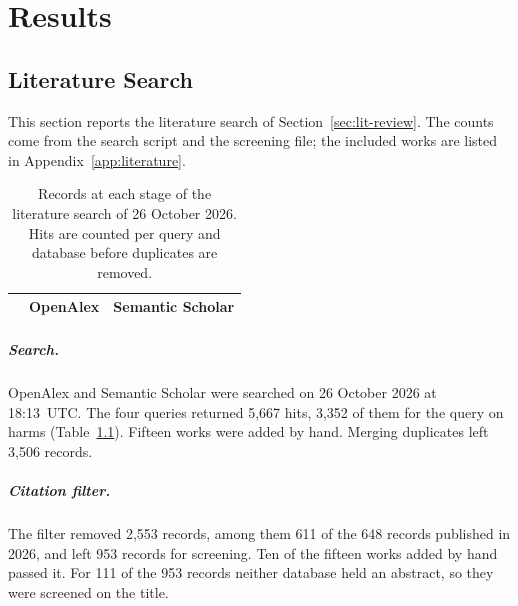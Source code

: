 \chapter{Results}
\label{ch:results}


\section{Literature Search}
\label{sec:results-lit}
This section reports the literature search of Section~\ref{sec:lit-review}.
The counts come from the search script and the screening file; the included
works are listed in Appendix~\ref{app:literature}.

\begin{table}[tbp]
\centering
\small
\caption[Records at each stage of the literature search]{Records at each stage
of the literature search of 26 October 2026. Hits are counted per query and
database before duplicates are removed.}
\label{tab:lit-flow}
\begin{tabular}{@{}lrr@{}}
\toprule
 & \textbf{OpenAlex} & \textbf{Semantic Scholar} \\
\midrule
\end{tabular}
\end{table}

\paragraph{Search.} OpenAlex and Semantic Scholar were searched on 26 October
2026 at 18:13~UTC\@. The four queries returned 5{,}667 hits, 3{,}352 of them for
the query on harms (Table~\ref{tab:lit-flow}). Fifteen works were added by
hand. Merging duplicates left 3{,}506 records.

\paragraph{Citation filter.} The filter removed 2{,}553 records, among them 611
of the 648 records published in 2026, and left 953 records for screening. Ten
of the fifteen works added by hand passed it. For 111 of the 953 records
neither database held an abstract, so they were screened on the title.

